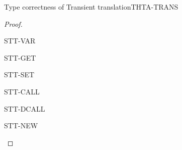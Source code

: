 \documentclass[acmlarge, anonymous, authordraft]{acmart}
\begin{document}
\begin{lemma}{Type correctness of Transient translation}{THTA-TRANS}
  \begin{conds}
    \cond{$\TR\K = \Kp$}
    \cond{$\TR\Env = \Envp$}
  \end{conds}

  \then\axiom{$\EnvType\Envp\cdot\Kp{\TRG{\e}\Env}{\t}$}

  \begin{proof} \indmsg{\EnvTypeW\Env\K\e\t}

    \begin{case}{STT-VAR}    
    \end{case}

    \begin{case}{STT-GET}
    \end{case}

    \begin{case}{STT-SET}
    \end{case}

    \begin{case}{STT-CALL}
    \end{case}

    \begin{case}{STT-DCALL}
    \end{case}

    \begin{case}{STT-NEW}
    \end{case}
  \end{proof}
\end{lemma}
\end{document}

